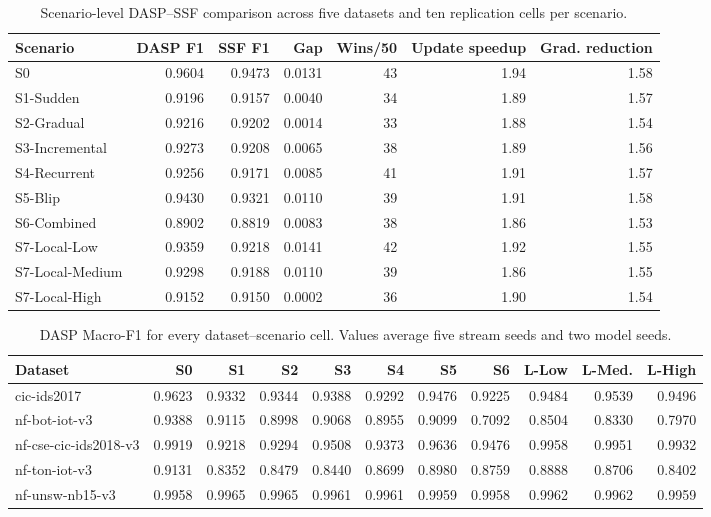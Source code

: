 \begin{table}[t]
\caption{Scenario-level DASP--SSF comparison across five datasets and ten replication cells per scenario.}
\label{tab:scenario-detail}
\centering
\begin{tabular}{lrrrrrr}
\toprule
Scenario & DASP F1 & SSF F1 & Gap & Wins/50 & Update speedup & Grad. reduction\\
\midrule
S0 & 0.9604 & 0.9473 & 0.0131 & 43 & 1.94 & 1.58\\
S1-Sudden & 0.9196 & 0.9157 & 0.0040 & 34 & 1.89 & 1.57\\
S2-Gradual & 0.9216 & 0.9202 & 0.0014 & 33 & 1.88 & 1.54\\
S3-Incremental & 0.9273 & 0.9208 & 0.0065 & 38 & 1.89 & 1.56\\
S4-Recurrent & 0.9256 & 0.9171 & 0.0085 & 41 & 1.91 & 1.57\\
S5-Blip & 0.9430 & 0.9321 & 0.0110 & 39 & 1.91 & 1.58\\
S6-Combined & 0.8902 & 0.8819 & 0.0083 & 38 & 1.86 & 1.53\\
S7-Local-Low & 0.9359 & 0.9218 & 0.0141 & 42 & 1.92 & 1.55\\
S7-Local-Medium & 0.9298 & 0.9188 & 0.0110 & 39 & 1.86 & 1.55\\
S7-Local-High & 0.9152 & 0.9150 & 0.0002 & 36 & 1.90 & 1.54\\
\bottomrule
\end{tabular}
\end{table}

\begin{table}[t]
\caption{DASP Macro-F1 for every dataset--scenario cell. Values average five stream seeds and two model seeds.}
\label{tab:dasp-cell-f1}
\centering
\scriptsize
\begin{tabular}{lrrrrrrrrrr}
\toprule
Dataset & S0 & S1 & S2 & S3 & S4 & S5 & S6 & L-Low & L-Med. & L-High\\
\midrule
cic-ids2017 & 0.9623 & 0.9332 & 0.9344 & 0.9388 & 0.9292 & 0.9476 & 0.9225 & 0.9484 & 0.9539 & 0.9496\\
nf-bot-iot-v3 & 0.9388 & 0.9115 & 0.8998 & 0.9068 & 0.8955 & 0.9099 & 0.7092 & 0.8504 & 0.8330 & 0.7970\\
nf-cse-cic-ids2018-v3 & 0.9919 & 0.9218 & 0.9294 & 0.9508 & 0.9373 & 0.9636 & 0.9476 & 0.9958 & 0.9951 & 0.9932\\
nf-ton-iot-v3 & 0.9131 & 0.8352 & 0.8479 & 0.8440 & 0.8699 & 0.8980 & 0.8759 & 0.8888 & 0.8706 & 0.8402\\
nf-unsw-nb15-v3 & 0.9958 & 0.9965 & 0.9965 & 0.9961 & 0.9961 & 0.9959 & 0.9958 & 0.9962 & 0.9962 & 0.9959\\
\bottomrule
\end{tabular}
\end{table}

